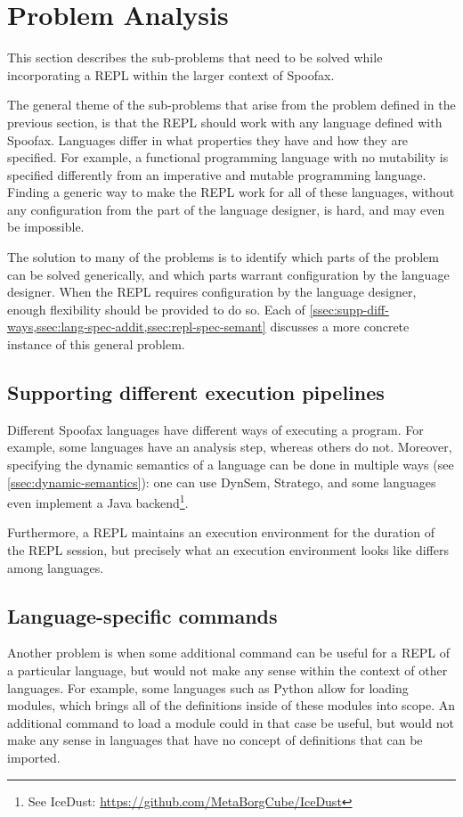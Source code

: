 \section{Problem Analysis}
\label{sec:problem-analysis}
This section describes the sub-problems that need to be solved while
incorporating a REPL within the larger context of Spoofax.

The general theme of the sub-problems that arise from the problem
defined in the previous section, is that the REPL should work
with any language defined with Spoofax. Languages differ in what
properties they have and how they are specified. For example, a
functional programming language with no mutability is specified
differently from an imperative and mutable programming
language. Finding a generic way to make the REPL work for all of these
languages, without any configuration from the part of the language
designer, is hard, and may even be impossible.

The solution to many of the problems is to identify which parts of the problem
can be solved generically, and which parts warrant configuration by the language
designer. When the REPL requires configuration by the language designer, enough
flexibility should be provided to do so. Each of
\cref{ssec:supp-diff-ways,ssec:lang-spec-addit,ssec:repl-spec-semant} discusses
a more concrete instance of this general problem.

\subsection{Supporting different execution pipelines}
\label{ssec:supp-diff-ways}
Different Spoofax languages have different ways of executing a program.
For example, some languages have an analysis step, whereas
others do not. Moreover, specifying the dynamic semantics of a language
can be done in multiple ways (see \cref{ssec:dynamic-semantics}): one
can use DynSem, Stratego, and some languages even implement a Java
backend\footnote{See IceDust:
  \url{https://github.com/MetaBorgCube/IceDust}}.

Furthermore, a REPL maintains an execution environment for the duration of the
REPL session, but precisely what an execution environment looks like differs
among languages.

\subsection{Language-specific commands}
\label{ssec:lang-spec-addit}
Another problem is when some additional command can be useful for a
REPL of a particular language, but would not make any sense within the
context of other languages. For example, some languages such as Python
allow for loading modules, which brings all of the definitions inside
of these modules into scope. An additional command to load a module
could in that case be useful, but would not make any sense in
languages that have no concept of definitions that can be imported.

